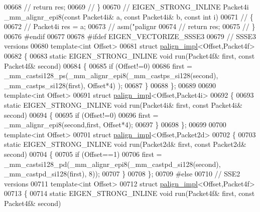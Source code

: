 \begin{DoxyCode}
{00668 \textcolor{comment}{//   return res;}
00669 \textcolor{comment}{// \}}
00670 \textcolor{comment}{// EIGEN\_STRONG\_INLINE Packet4i \_mm\_alignr\_epi8(const Packet4i&  a, const Packet4i&  b, const int i)}
00671 \textcolor{comment}{// \{}
00672 \textcolor{comment}{//   Packet4i res = a;}
00673 \textcolor{comment}{//   asm("palignr %
00674 \textcolor{comment}{//   return res;}
00675 \textcolor{comment}{// \}}
00676 \textcolor{preprocessor}{#endif}
00677 
00678 \textcolor{preprocessor}{#ifdef EIGEN\_VECTORIZE\_SSSE3}
00679 \textcolor{comment}{// SSSE3 versions}
00680 \textcolor{keyword}{template}<\textcolor{keywordtype}{int} Offset>
00681 \textcolor{keyword}{struct }\hyperlink{struct_eigen_1_1internal_1_1palign__impl}{palign\_impl}<Offset,Packet4f>
00682 \{
00683   \textcolor{keyword}{static} EIGEN\_STRONG\_INLINE \textcolor{keywordtype}{void} run(Packet4f& first, \textcolor{keyword}{const} Packet4f& second)
00684   \{
00685     \textcolor{keywordflow}{if} (Offset!=0)
00686       first = \_mm\_castsi128\_ps(\_mm\_alignr\_epi8(\_mm\_castps\_si128(second), \_mm\_castps\_si128(first), Offset*4)
      );
00687   \}
00688 \};
00689 
00690 \textcolor{keyword}{template}<\textcolor{keywordtype}{int} Offset>
00691 \textcolor{keyword}{struct }\hyperlink{struct_eigen_1_1internal_1_1palign__impl}{palign\_impl}<Offset,Packet4i>
00692 \{
00693   \textcolor{keyword}{static} EIGEN\_STRONG\_INLINE \textcolor{keywordtype}{void} run(Packet4i& first, \textcolor{keyword}{const} Packet4i& second)
00694   \{
00695     \textcolor{keywordflow}{if} (Offset!=0)
00696       first = \_mm\_alignr\_epi8(second,first, Offset*4);
00697   \}
00698 \};
00699 
00700 \textcolor{keyword}{template}<\textcolor{keywordtype}{int} Offset>
00701 \textcolor{keyword}{struct }\hyperlink{struct_eigen_1_1internal_1_1palign__impl}{palign\_impl}<Offset,Packet2d>
00702 \{
00703   \textcolor{keyword}{static} EIGEN\_STRONG\_INLINE \textcolor{keywordtype}{void} run(Packet2d& first, \textcolor{keyword}{const} Packet2d& second)
00704   \{
00705     \textcolor{keywordflow}{if} (Offset==1)
00706       first = \_mm\_castsi128\_pd(\_mm\_alignr\_epi8(\_mm\_castpd\_si128(second), \_mm\_castpd\_si128(first), 8));
00707   \}
00708 \};
00709 \textcolor{preprocessor}{#else}
00710 \textcolor{comment}{// SSE2 versions}
00711 \textcolor{keyword}{template}<\textcolor{keywordtype}{int} Offset>
00712 \textcolor{keyword}{struct }\hyperlink{struct_eigen_1_1internal_1_1palign__impl}{palign\_impl}<Offset,Packet4f>
00713 \{
00714   \textcolor{keyword}{static} EIGEN\_STRONG\_INLINE \textcolor{keywordtype}{void} run(Packet4f& first, \textcolor{keyword}{const} Packet4f& second)
}}
\end{DoxyCode}
